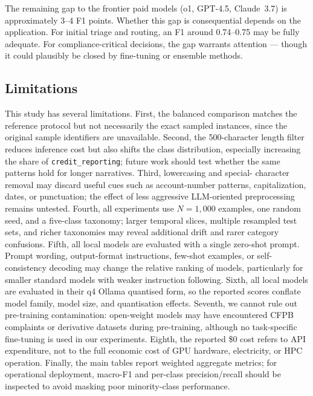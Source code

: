 \documentclass[journal]{IEEEtran}
\begin{document}
The remaining gap to the frontier paid models (o1, GPT-4.5,
Claude~3.7) is approximately 3–4 F1 points. Whether this gap
is consequential depends on the application. For initial triage
and routing, an F1 around 0.74–0.75 may be fully adequate.
For compliance-critical decisions, the gap warrants attention —
though it could plausibly be closed by fine-tuning
\cite{gullu2025llama,li2024customerservice} or ensemble methods.

\subsection{Limitations}

This study has several limitations. First, the balanced comparison
matches the reference protocol but not necessarily the exact sampled
instances, since the original sample identifiers are unavailable.
Second, the 500-character length filter reduces inference cost but
also shifts the class distribution, especially increasing the share of
\texttt{credit\_reporting}; future work should test whether the same
patterns hold for longer narratives. Third, lowercasing and special-
character removal may discard useful cues such as account-number
patterns, capitalization, dates, or punctuation; the effect of less
aggressive LLM-oriented preprocessing remains untested. Fourth, all
experiments use
$N{=}1{,}000$ examples, one random seed, and a five-class taxonomy;
larger temporal slices, multiple resampled test sets, and richer
taxonomies may reveal additional drift and rarer category confusions.
Fifth, all local models are evaluated with a single zero-shot prompt.
Prompt wording, output-format instructions, few-shot examples, or
self-consistency decoding may change the relative ranking of models,
particularly for smaller standard models with weaker instruction
following. Sixth, all local models are evaluated in their q4 Ollama
quantised form, so the reported scores conflate model family, model
size, and quantisation effects. Seventh, we cannot rule out pre-training
contamination: open-weight models may have encountered CFPB complaints
or derivative datasets during pre-training, although no task-specific
fine-tuning is used in our experiments. Eighth, the reported \$0 cost
refers to API expenditure, not to the full economic cost of GPU
hardware, electricity, or HPC operation. Finally, the main tables
report weighted aggregate metrics; for operational deployment,
macro-F1 and per-class precision/recall should be inspected to avoid
masking poor minority-class performance.
\end{document}
